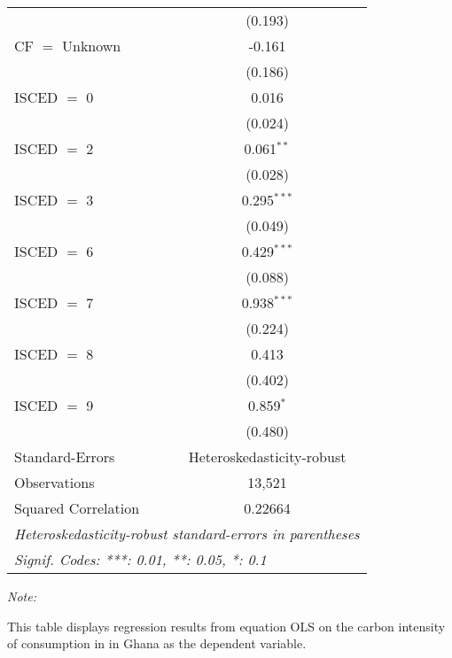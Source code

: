 \begin{table}[htbp!]
\begin{adjustbox}{width = 1\textwidth, max height = 0.95\textheight, center}
\begin{threeparttable}[b]
\begin{tabular}{lc}
                                & (0.193)\\   
            CF $=$ Unknown      & -0.161\\   
                                & (0.186)\\   
            ISCED $=$ 0         & 0.016\\   
                                & (0.024)\\   
            ISCED $=$ 2         & 0.061$^{**}$\\   
                                & (0.028)\\   
            ISCED $=$ 3         & 0.295$^{***}$\\   
                                & (0.049)\\   
            ISCED $=$ 6         & 0.429$^{***}$\\   
                                & (0.088)\\   
            ISCED $=$ 7         & 0.938$^{***}$\\   
                                & (0.224)\\   
            ISCED $=$ 8         & 0.413\\   
                                & (0.402)\\   
            ISCED $=$ 9         & 0.859$^{*}$\\   
                                & (0.480)\\   
            \midrule 
            Standard-Errors     & Heteroskedasticity-robust \\   
            Observations        & 13,521\\  
            Squared Correlation & 0.22664\\  
            \midrule \midrule
            \multicolumn{2}{l}{\emph{Heteroskedasticity-robust standard-errors in parentheses}}\\
            \multicolumn{2}{l}{\emph{Signif. Codes: ***: 0.01, **: 0.05, *: 0.1}}\\
         \end{tabular}
         
         \begin{tablenotes}\item \medskip \textit{Note:}
            \item This table displays regression results from equation OLS on the carbon intensity of consumption in  in Ghana as the dependent variable. 
         \end{tablenotes}
      \end{threeparttable}
   \end{adjustbox}
\end{table}


